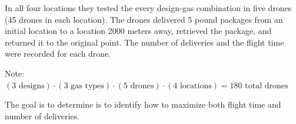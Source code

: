 \documentclass[addpoints]{examsetup}\usepackage[]{graphicx}\usepackage[]{color}
\begin{document}
\begin{questions}
In all four locations they tested the every design-gas combination in five drones (45 drones in each location).
The drones delivered 5 pound packages from an initial location to a location 2000 meters away, retrieved the package, and returned it to the original point.
The number of deliveries and the flight time were recorded for each drone.

Note: \((\text{3 designs}) \cdot (\text{3 gas types}) \cdot (\text{5 drones}) \cdot (\text{4 locations}) = \text{180 total drones}\)

The goal is to determine is to identify how to maximize both flight time and number of deliveries.

\end{questions}
\end{document}
